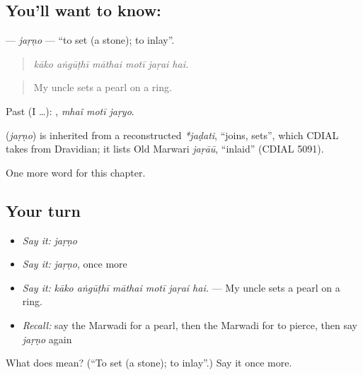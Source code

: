 \subsection*{You'll want to know: }
\textbf{} — \emph{jaṛṇo} — \textquotedblleft{}to set (a stone); to inlay\textquotedblright{}.

\begin{quote}
     
\end{quote}

\begin{quote}
\emph{kāko aṅgūṭhī māthai motī jaṛai hai.}
\end{quote}

\begin{quote}
My uncle sets a pearl on a ring.
\end{quote}

Past (I …):   , \emph{mhaĩ motī jaṛyo}.

\begin{cousinweb}
\textbf{} (\emph{jaṛṇo}) is inherited from a reconstructed \emph{*jaḍati}, \textquotedblleft{}joins, sets\textquotedblright{}, which CDIAL takes from Dravidian; it lists Old Marwari \emph{jaṛāū}, \textquotedblleft{}inlaid\textquotedblright{} (CDIAL 5091).
\end{cousinweb}

\begin{grammarlens}[title={What you've built}]
One more word for this chapter.
\end{grammarlens}

\subsection*{Your turn}
\begin{itemize}
\raggedright
  \item \emph{Say it:} \emph{jaṛṇo}
  \item \emph{Say it:} \emph{jaṛṇo}, once more
  \item \emph{Say it:} \emph{kāko aṅgūṭhī māthai motī jaṛai hai.} — My uncle sets a pearl on a ring.
  \item \emph{Recall:} say the Marwadi for a pearl, then the Marwadi for to pierce, then say \emph{jaṛṇo} again
\end{itemize}

\begin{tcolorbox}[breakable,colback=teal!4,colframe=teal!35!black,title={Before you move on}]
What does  mean? (\textquotedblleft{}To set (a stone); to inlay\textquotedblright{}.) Say it once more.
\end{tcolorbox}
